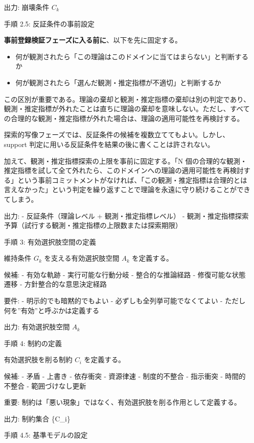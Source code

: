 \documentclass[12pt,a4paper]{article}
\begin{document}
出力: 崩壊条件 \(C_{k}\)

手順 2.5: 反証条件の事前設定

\textbf{事前登録検証フェーズに入る前に}、以下を先に固定する。

\begin{itemize}
\tightlist
\item
  何が観測されたら「この理論はこのドメインに当てはまらない」と判断するか
\item
  何が観測されたら「選んだ観測・推定指標が不適切」と判断するか
\end{itemize}

この区別が重要である。理論の棄却と観測・推定指標の棄却は別の判定であり、観測・推定指標が外れたことは直ちに理論の棄却を意味しない。ただし、すべての合理的な観測・推定指標が外れた場合は、理論の適用可能性を再検討する。

探索的写像フェーズでは、反証条件の候補を複数立ててもよい。しかし、support 判定に用いる反証条件を結果の後に書くことは許されない。

加えて、観測・推定指標探索の上限を事前に固定する。「N 個の合理的な観測・推定指標を試して全て外れたら、このドメインへの理論の適用可能性を再検討する」という事前コミットメントがなければ、「この観測・推定指標は合理的とは言えなかった」という判定を繰り返すことで理論を永遠に守り続けることができてしまう。

出力: - 反証条件（理論レベル + 観測・推定指標レベル） - 観測・推定指標探索予算（試行する観測・推定指標の上限数または探索期限）

手順 3: 有効選択肢空間の定義

維持条件 \(G_{k}\) を支える有効選択肢空間 \(A_{k}\) を定義する。

候補: - 有効な軌跡 - 実行可能な行動分岐 - 整合的な推論経路 - 修復可能な状態遷移 - 方針整合的な意思決定経路

要件: - 明示的でも暗黙的でもよい - 必ずしも全列挙可能でなくてよい - ただし何を''有効''と呼ぶかは定義する

出力: 有効選択肢空間 \(A_{k}\)

手順 4: 制約の定義

有効選択肢を削る制約 \(C_{i}\) を定義する。

候補: - 矛盾 - 上書き - 依存衝突 - 資源律速 - 制度的不整合 - 指示衝突 - 時間的不整合 - 範囲づけなし更新

重要: 制約は「悪い現象」ではなく、有効選択肢を削る作用として定義する。

出力: 制約集合 \{C\_i\}

手順 4.5: 基準モデルの設定
\end{document}
